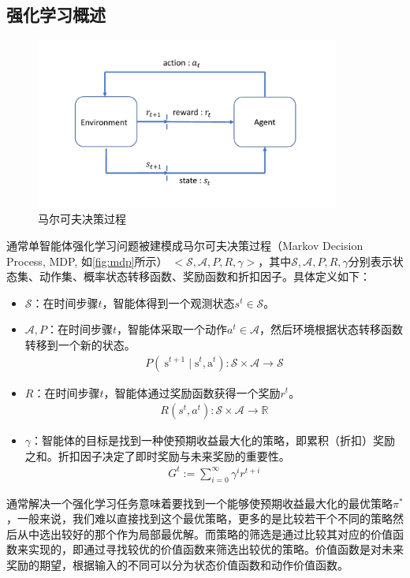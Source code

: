 \subsection{强化学习概述}
\begin{figure}[htb]
    \includegraphics[width=10cm]{fig/rl.pdf}
    \caption{马尔可夫决策过程}
    \label{fig:mdp}
\end{figure}
通常单智能体强化学习问题被建模成马尔可夫决策过程（Markov Decision Process, MDP, 如\autoref{fig:mdp}所示） $<\mathcal{S}, \mathcal{A}, P, R, \gamma>$，其中$\mathcal{S}, \mathcal{A}, P, R, \gamma$分别表示状态集、动作集、概率状态转移函数、奖励函数和折扣因子。具体定义如下：
\begin{itemize}
    \item $\mathcal{S}$：在时间步骤$t$，智能体得到一个观测状态$s^t \in \mathcal{S}$。
    \item $\mathcal{A}, P$：在时间步骤$t$，智能体采取一个动作$a^t \in \mathcal{A}$，然后环境根据状态转移函数转移到一个新的状态。
    \begin{align}
        P\left(\mathrm{~s}^{t+1} \mid \mathrm{s}^{t}, \mathrm{a}^{t}\right): \mathcal{S} \times \mathcal{A} \rightarrow \mathcal{S}
    \end{align}
    \item $R$：在时间步骤$t$，智能体通过奖励函数获得一个奖励$r^t$。
    \begin{align}
        R\left(s^{t}, a^{t}\right): \mathcal{S} \times \mathcal{A} \rightarrow \mathbb{R}
    \end{align}
    \item $\gamma$：智能体的目标是找到一种使预期收益最大化的策略，即累积（折扣）奖励之和。折扣因子决定了即时奖励与未来奖励的重要性。
    \begin{align}
        G^{t}:=\sum_{i=0}^{\infty} \gamma^{i} r^{t+i}
    \end{align}
  \end{itemize}
通常解决一个强化学习任务意味着要找到一个能够使预期收益最大化的最优策略$\pi^*$，一般来说，我们难以直接找到这个最优策略，更多的是比较若干个不同的策略然后从中选出较好的那个作为局部最优解。而策略的筛选是通过比较其对应的价值函数来实现的，即通过寻找较优的价值函数来筛选出较优的策略。价值函数是对未来奖励的期望，根据输入的不同可以分为状态价值函数和动作价值函数。
